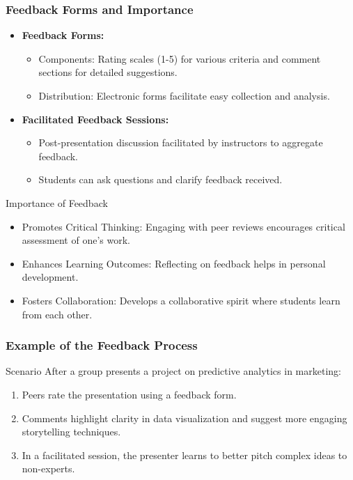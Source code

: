 \documentclass[aspectratio=169]{beamer}
\begin{document}
\begin{frame}[fragile]
    \frametitle{Feedback Forms and Importance}
    \begin{itemize}
        \item \textbf{Feedback Forms:}
        \begin{itemize}
            \item Components: Rating scales (1-5) for various criteria and comment sections for detailed suggestions.
            \item Distribution: Electronic forms facilitate easy collection and analysis.
        \end{itemize}

        \item \textbf{Facilitated Feedback Sessions:}
        \begin{itemize}
            \item Post-presentation discussion facilitated by instructors to aggregate feedback.
            \item Students can ask questions and clarify feedback received.
        \end{itemize}
    \end{itemize}

    \begin{block}{Importance of Feedback}
        \begin{itemize}
            \item Promotes Critical Thinking: Engaging with peer reviews encourages critical assessment of one's work.
            \item Enhances Learning Outcomes: Reflecting on feedback helps in personal development.
            \item Fosters Collaboration: Develops a collaborative spirit where students learn from each other.
        \end{itemize}
    \end{block}
\end{frame}

\begin{frame}[fragile]
    \frametitle{Example of the Feedback Process}
    \begin{block}{Scenario}
        After a group presents a project on predictive analytics in marketing:
        \begin{enumerate}
            \item Peers rate the presentation using a feedback form.
            \item Comments highlight clarity in data visualization and suggest more engaging storytelling techniques.
            \item In a facilitated session, the presenter learns to better pitch complex ideas to non-experts.
        \end{enumerate}
    \end{block}
\end{frame}
\end{document}
